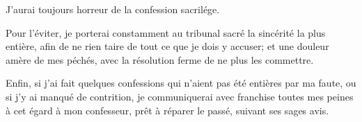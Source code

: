 \documentclass[instructions.tex]{subfiles}
\begin{document}
\primo J’aurai toujours horreur de la confession sacrilége.
 
\secundo Pour l’éviter, je porterai constamment au tribunal sacré la sincérité la plus entière, afin de ne rien taire de tout ce que je dois y accuser; et une douleur amère de mes péchés, avec la résolution ferme de ne plus les commettre.
 
\tertio Enfin, si j’ai fait quelques confessions qui n’aient pas été entières par ma faute, ou si j’y ai manqué de contrition, je communiquerai avec franchise toutes mes peines à cet égard à mon confesseur, prêt à réparer le passé, suivant ses sages avis.

 
\end{document}
